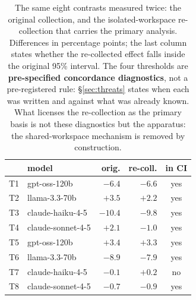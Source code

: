 \begin{table}[t]
\centering
\caption{The same eight contrasts measured twice: the original collection, and the isolated-workspace re-collection that carries the primary analysis. Differences in percentage points; the last column states whether the re-collected effect falls inside the original 95\% interval. The four thresholds are \textbf{pre-specified concordance diagnostics}, not a pre-registered rule: \S\ref{sec:threats} states when each was written and against what was already known. What licenses the re-collection as the primary basis is not these diagnostics but the apparatus: the shared-workspace mechanism is removed by construction.}
\label{tab:riraccolta}
\footnotesize
\setlength{\tabcolsep}{5pt}
\begin{tabular}{@{}llrrc@{}}
\toprule
 & model & orig. & re-coll. & in CI \\
\midrule
T1 & gpt-oss-120b & $-6.4$ & $-6.6$ & yes \\
T2 & llama-3.3-70b & $+3.5$ & $+2.2$ & yes \\
T3 & claude-haiku-4-5 & $-10.4$ & $-9.8$ & yes \\
T4 & claude-sonnet-4-5 & $+2.1$ & $-1.0$ & yes \\
T5 & gpt-oss-120b & $+3.4$ & $+3.3$ & yes \\
T6 & llama-3.3-70b & $-8.9$ & $-7.9$ & yes \\
T7 & claude-haiku-4-5 & $-0.1$ & $+0.2$ & no \\
T8 & claude-sonnet-4-5 & $-0.7$ & $-0.9$ & yes \\
\bottomrule
\end{tabular}
\end{table}

